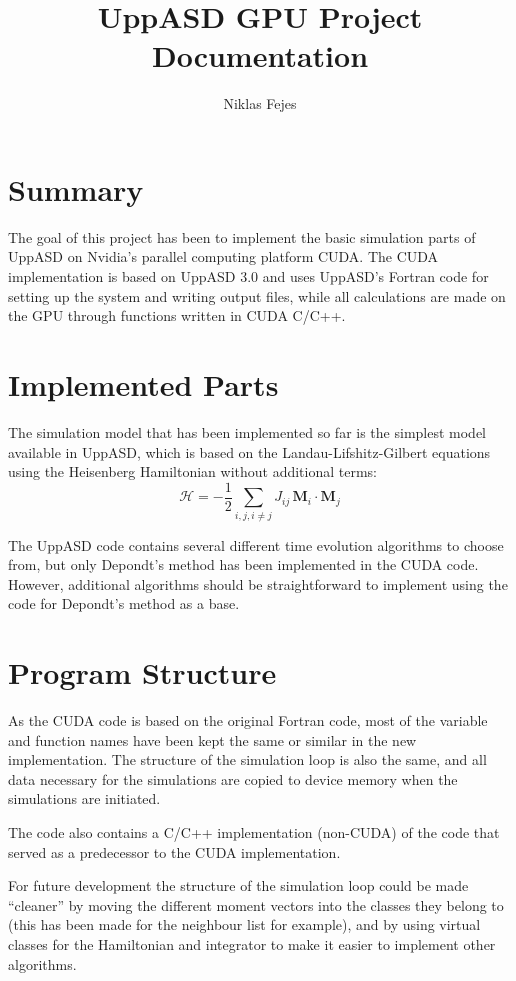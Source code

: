 \documentclass{article}
\begin{document}
\title{UppASD GPU Project Documentation}
\author{Niklas Fejes}
\maketitle


\section{Summary}
The goal of this project has been to implement the basic simulation parts of
UppASD on Nvidia's parallel computing platform CUDA. The CUDA implementation 
is based on UppASD 3.0 and uses UppASD's Fortran code for setting up the 
system and writing output files, while all calculations are made on the GPU 
through functions written in CUDA C/C++.


\section{Implemented Parts}
The simulation model that has been implemented so far is the simplest model 
available in UppASD, which is based on the Landau-Lifshitz-Gilbert equations 
using the Heisenberg Hamiltonian without additional terms:
\[
\mathscr{H} = - \frac{1}{2} \sum_{i,j,i\ne j} J_{ij} \, \mathbf{M}_i \cdot \mathbf{M}_j
\]

The UppASD code contains several different time evolution algorithms to choose 
from, but only Depondt's method has been implemented in the CUDA code. 
However, additional algorithms should be straightforward to implement using the 
code for Depondt's method as a base.


\section{Program Structure}
As the CUDA code is based on the original Fortran code, most of the variable 
and function names have been kept the same or similar in the new 
implementation. The structure of the simulation loop is also the same, and 
all data necessary for the simulations are copied to device memory when the 
simulations are initiated.

The code also contains a C/C++ implementation (non-CUDA) of the code that 
served as a predecessor to the CUDA implementation.

For future development the structure of the simulation loop could be made 
``cleaner'' by moving the different moment vectors into the classes they 
belong to (this has been made for the neighbour list for example), and by 
using virtual classes for the Hamiltonian and integrator to make it easier 
to implement other algorithms.
\end{document}
